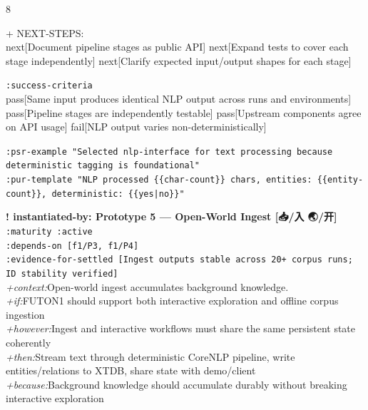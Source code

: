 \documentclass[landscape]{article}
\newcommand{\flexitag}[1]{\textcolor[gray]{0.35}{\textit{#1}}}
\newenvironment{devmapactive}{%
  \def\FrameCommand{\colorbox{devmapactivebg}}%
  \setlength{\fboxsep}{2pt}%
  \MakeFramed{\advance\hsize-\width \FrameRestore}%
}{\endMakeFramed}
\begin{document}
\begin{paracol}{8}
\begin{devmapactive}
\par
  + NEXT-STEPS:\\
    next[Document pipeline stages as public API] next[Expand tests to cover each stage independently] next[Clarify expected input/output shapes for each stage]\\
\par
  \texttt{:\allowbreak{}success-\allowbreak{}criteria}\\
    pass[Same input produces identical NLP output across runs and environments] pass[Pipeline stages are independently testable] pass[Upstream components agree on API usage] fail[NLP output varies non-deterministically]\\
\par
  \texttt{:\allowbreak{}psr-\allowbreak{}example "Selected nlp-\allowbreak{}interface for text processing because deterministic tagging is foundational"}\\
  \texttt{:\allowbreak{}pur-\allowbreak{}template "NLP processed \{\{char-\allowbreak{}count\}\} chars,\allowbreak{} entities:\allowbreak{} \{\{entity-\allowbreak{}count\}\},\allowbreak{} deterministic:\allowbreak{} \{\{yes|\allowbreak{}no\}\}"}\\
\par
\par
\end{devmapactive}
\begin{devmapactive}
\textbf{! instantiated-by: Prototype 5 — Open-World Ingest [📥/入 🌏/开]}\\
  \texttt{:\allowbreak{}maturity :\allowbreak{}active}\\
  \texttt{:\allowbreak{}depends-\allowbreak{}on [f1/\allowbreak{}P3,\allowbreak{} f1/\allowbreak{}P4]}\\
  \texttt{:\allowbreak{}evidence-\allowbreak{}for-\allowbreak{}settled [Ingest outputs stable across 20+\allowbreak{} corpus runs;\allowbreak{} ID stability verified]}\\
  \flexitag{+context:}Open-world ingest accumulates background knowledge.\\
  \flexitag{+if:}FUTON1 should support both interactive exploration and offline corpus ingestion\\
  \flexitag{+however:}Ingest and interactive workflows must share the same persistent state coherently\\
  \flexitag{+then:}Stream text through deterministic CoreNLP pipeline, write entities/relations to XTDB, share state with demo/client\\
  \flexitag{+because:}Background knowledge should accumulate durably without breaking interactive exploration\\

\end{devmapactive}
\end{paracol}
\end{document}
